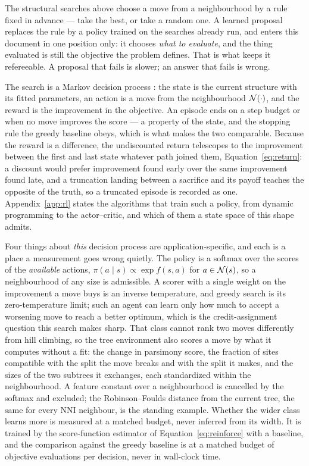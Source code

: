 \documentclass[11pt,a4paper]{article}
\begin{document}
The structural searches above choose a move from a neighbourhood by a rule
fixed in advance --- take the best, or take a random one. A learned proposal
replaces the rule by a policy trained on the searches already run, and enters
this document in one position only: it chooses \emph{what to evaluate}, and the
thing evaluated is still the objective the problem defines. That is what keeps
it refereeable. A proposal that fails is slower; an answer that fails is wrong.

The search is a Markov decision process \citep{suttonbarto2018}: the state is
the current structure with its fitted parameters, an action is a move from the
neighbourhood $\mathcal{N}(\cdot)$, and the reward is the improvement in the
objective. An episode ends on a step budget or when no move improves the
score --- a property of the state, and the stopping rule the greedy baseline
obeys, which is what makes the two comparable. Because the reward is a
difference, the undiscounted return telescopes to the improvement between the
first and last state whatever path joined them,
Equation~\ref{eq:return}: a discount would prefer improvement found early over
the same improvement found late, and a truncation landing between a sacrifice
and its payoff teaches the opposite of the truth, so a truncated episode is
recorded as one. Appendix~\ref{app:rl} states the algorithms that train such a
policy, from dynamic programming to the actor--critic, and which of them a
state space of this shape admits.

Four things about \emph{this} decision process are application-specific, and
each is a place a measurement goes wrong quietly.
The policy is a softmax over the scores of the \emph{available} actions,
$\pi(a \mid s) \propto \exp f(s, a)$ for $a \in \mathcal{N}(s)$, so a
neighbourhood of any size is admissible. A scorer with a single weight on the
improvement a move buys is an inverse temperature, and greedy search is its
zero-temperature limit; such an agent can learn only how much to accept a
worsening move to reach a better optimum, which is the credit-assignment
question this search makes sharp. That class cannot rank two moves differently
from hill climbing, so the tree environment also scores a move by what it
computes without a fit: the change in parsimony score, the fraction of sites
compatible with the split the move breaks and with the split it makes, and the
sizes of the two subtrees it exchanges, each standardized within the
neighbourhood. A feature constant over a neighbourhood is cancelled by the
softmax and excluded; the Robinson--Foulds distance from the current tree, the
same for every NNI neighbour, is the standing example. Whether the wider class
learns more is measured at a matched budget, never inferred from its width.
It is trained by the score-function estimator of
Equation~\ref{eq:reinforce} with a baseline, and the comparison against the
greedy baseline is at a matched budget of objective evaluations per decision,
never in wall-clock time.
\end{document}
